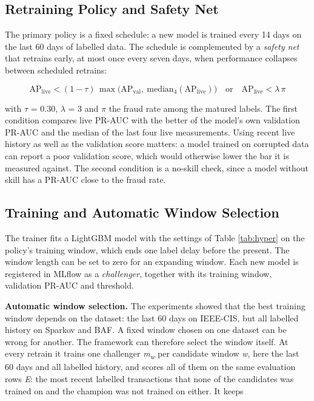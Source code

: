 \subsection{Retraining Policy and Safety Net}\label{sec:safety}

The primary policy is a fixed schedule: a new model is trained every 14 days on the last 60 days of labelled data. The schedule is complemented by a \textit{safety net} that retrains early, at most once every seven days, when performance collapses between scheduled retrains:

\begin{equation}
  \mathrm{AP}_{\mathrm{live}} < (1 - \tau)\,\max\big(\mathrm{AP}_{\mathrm{val}},\ \mathrm{median}_{4}(\mathrm{AP}_{\mathrm{live}})\big)\quad\text{or}\quad \mathrm{AP}_{\mathrm{live}} < \lambda\,\pi
  \label{eq:safety}
\end{equation}

with $\tau$ = 0.30, $\lambda$ = 3 and $\pi$ the fraud rate among the matured labels. The first condition compares live PR-AUC with the better of the model's own validation PR-AUC and the median of the last four live measurements. Using recent live history as well as the validation score matters: a model trained on corrupted data can report a poor validation score, which would otherwise lower the bar it is measured against. The second condition is a no-skill check, since a model without skill has a PR-AUC close to the fraud rate.

\subsection{Training and Automatic Window Selection}\label{sec:window}

The trainer fits a LightGBM model with the settings of Table \ref{tab:hyper} on the policy's training window, which ends one label delay before the present. The window length can be set to zero for an expanding window. Each new model is registered in MLflow as a \textit{challenger}, together with its training window, validation PR-AUC and threshold.

\textbf{Automatic window selection.} The experiments showed that the best training window depends on the dataset: the last 60 days on IEEE-CIS, but all labelled history on Sparkov and BAF. A fixed window chosen on one dataset can be wrong for another. The framework can therefore select the window itself. At every retrain it trains one challenger \textit{m\textsubscript{w}} per candidate window \textit{w}, here the last 60 days and all labelled history, and scores all of them on the same evaluation rows \textit{E}: the most recent labelled transactions that none of the candidates was trained on and the champion was not trained on either. It keeps

